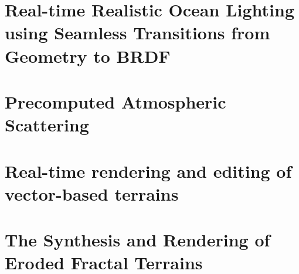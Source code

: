 \section{Real-time Realistic Ocean Lighting using Seamless Transitions from Geometry to BRDF}


\section{Precomputed Atmospheric Scattering}


\section{Real-time rendering and editing of vector-based terrains}


\section{The Synthesis and Rendering of Eroded Fractal Terrains}


